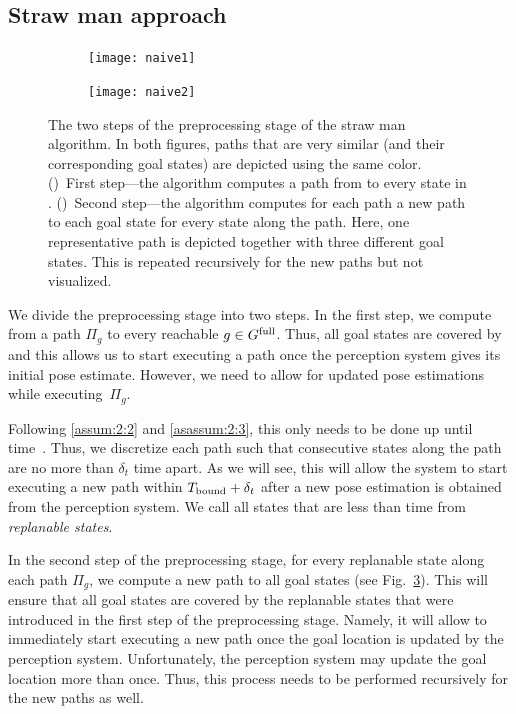 \documentclass[a4paper]{report}
\begin{document}
\subsection{Straw man approach}
\label{subsec:strawman}
\begin{figure}[t]
    \centering
    \begin{subfigure}{.49\textwidth}
        \texttt{[image: naive1]}
        \caption{}
        \label{fig:naive1}
    \end{subfigure}
    \hfill
    \begin{subfigure}{0.49\textwidth}
        \texttt{[image: naive2]}
        \caption{}
        \label{fig:naive2}
    \end{subfigure}
    \caption{
    \CaptionTextSize
    The two steps of the preprocessing stage of the straw man algorithm. In both figures, paths that are very similar (and their corresponding goal states) are depicted using the same color.
    ()~First step---the algorithm computes a path from \Shome to every state in \Gfull.
    ()~Second step---the algorithm computes for each path a new path to each goal state for every state along the path. Here, one representative path is depicted together with three different goal states. 
    This is repeated recursively for the new paths but not visualized.}
    \label{fig:naive}
    \vspace{-5mm}
\end{figure}

We divide the preprocessing stage into two steps.
In the first step, we compute from \Shome a path $\Pi_g$ to every reachable $g \in G^{\textrm{full}}$.
Thus, all goal states are covered by \Shome and this allows us to start executing a path once the perception system gives its initial pose estimate.
However, we need to allow for updated pose estimations while executing~$\Pi_g$. 

%
Following \ref{assum:2:2} and \ref{asassum:2:3}, this only needs to be done up until time~\Trc.
Thus, we discretize each path such that consecutive states along the path are no more than $\delta _t$ time apart. As we will see, this will allow the system to start executing a new path within $T_{\textrm{bound}} + \delta_t$ after a new pose estimation is obtained from the perception system.
%
We call all states that are less than \Trc time from \Shome \emph{replanable states}.


In the second step of the preprocessing stage, for every replanable state along each path $\Pi_g$, we compute a new path to all goal states (see Fig.~\ref{fig:naive}).
%
This will ensure that all goal states are covered by the replanable states that were introduced in the first step of the preprocessing stage. Namely, it will allow to immediately start executing a new path once the goal location is updated by the perception system.
%
Unfortunately, the perception system may update the goal location more than once. Thus, this process needs to be performed recursively for the new paths as well.
\end{document}

